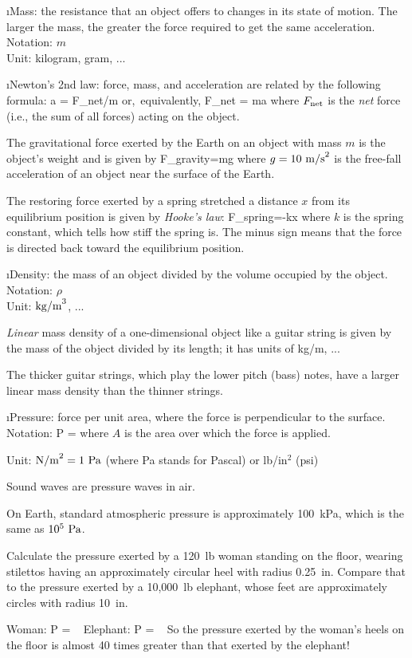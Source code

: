 \i Mass: 
the resistance that an object offers to changes in its state
of motion.
The larger the mass, the greater the force required to
get the same acceleration.
\\
Notation: $m$
\\
Unit: kilogram, gram, ...

\i Newton's 2nd law:
force, mass, and acceleration are related by the following formula:
%
\be
a = {F_{\rm net}}/{m} \quad
{\rm or,\ equivalently,}
\quad
F_{\rm net} = ma
\ee
%
where $F_{\rm net}$ is the {\em net} force (i.e., the sum of all forces) 
acting on the object.

\ex
The gravitational force exerted by the Earth on an object 
with mass $m$ is the object's weight and is given by 
%
\be
F_{\rm gravity}=mg
\ee
%
where $g=10~{\rm m/s}^2$ is the free-fall acceleration of
an object near the surface of the Earth.

\ex
The restoring force exerted by a spring stretched a distance
$x$ from its equilibrium position is given by {\em Hooke's law}:
%
\be
F_{\rm spring}=-kx
\ee
%
where $k$ is the spring constant, which tells how stiff the spring is.
The minus sign means that the force is directed back toward the 
equilibrium position.

\i Density:
the mass of an object divided by the volume occupied by the object.
\\
Notation: $\rho$
\\
Unit: ${\rm kg/m}^3$, ...

{\em Linear} mass density of a one-dimensional object like a guitar
string is given by the mass of the object divided by its length;
it has units of kg/m, ...

\ex The thicker guitar strings, which play the lower pitch (bass)
notes, have a larger linear mass density than the thinner strings.

\i Pressure:
force per unit area, where the force is perpendicular to the surface.
\\
Notation:
%
\be
P =
\ee
%
where $A$ is the area over which the force is applied.

Unit: ${\rm N/m}^2= 1~{\rm Pa}$ (where Pa stands for Pascal) or
lb/in$^2$ (psi)

\ex Sound waves are pressure waves in air.

\ex On Earth, standard atmospheric pressure is approximately 
100~kPa, which is the same as $10^5~{\rm Pa}$.

\exer Calculate the pressure exerted by a 120~lb woman 
standing on the floor, 
wearing stilettos having an approximately circular 
heel with radius 0.25~in.
Compare that to the pressure exerted by a 
10,000~lb elephant,
whose feet are approximately circles with radius 10~in.

\ans

Woman:
%
\be
P = 
~
\ee
%
%
Elephant:
%
\be
P = 
~
\ee
%
So the pressure exerted by the woman's heels on the floor 
is almost 40 times greater than that exerted by the elephant!

\ei
